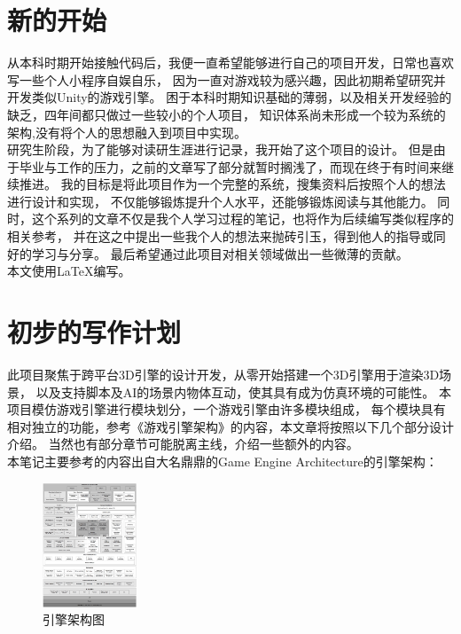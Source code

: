 \section{新的开始}

从本科时期开始接触代码后，我便一直希望能够进行自己的项目开发，日常也喜欢写一些个人小程序自娱自乐，
因为一直对游戏较为感兴趣，因此初期希望研究并开发类似Unity的游戏引擎。
困于本科时期知识基础的薄弱，以及相关开发经验的缺乏，四年间都只做过一些较小的个人项目，
知识体系尚未形成一个较为系统的架构,没有将个人的思想融入到项目中实现。\\

研究生阶段，为了能够对读研生涯进行记录，我开始了这个项目的设计。
但是由于毕业与工作的压力，之前的文章写了部分就暂时搁浅了，而现在终于有时间来继续推进。
我的目标是将此项目作为一个完整的系统，搜集资料后按照个人的想法进行设计和实现，
不仅能够锻炼提升个人水平，还能够锻炼阅读与其他能力。
同时，这个系列的文章不仅是我个人学习过程的笔记，也将作为后续编写类似程序的相关参考，
并在这之中提出一些我个人的想法来抛砖引玉，得到他人的指导或同好的学习与分享。
最后希望通过此项目对相关领域做出一些微薄的贡献。\\

本文使用\LaTeX{}编写。

\maketitle
\section{初步的写作计划}

此项目聚焦于跨平台3D引擎的设计开发，从零开始搭建一个3D引擎用于渲染3D场景，
以及支持脚本及AI的场景内物体互动，使其具有成为仿真环境的可能性。
本项目模仿游戏引擎进行模块划分，一个游戏引擎由许多模块组成，
每个模块具有相对独立的功能，参考《游戏引擎架构》的内容，本文章将按照以下几个部分设计介绍。
当然也有部分章节可能脱离主线，介绍一些额外的内容。\\

本笔记主要参考的内容出自大名鼎鼎的Game Engine Architecture的引擎架构：
\begin{figure}[H]
\centering
\includegraphics[center, width=0.25\textwidth]{chapter00/fig-runtime-arch.jpeg}
\caption{引擎架构图}
\end{figure}

